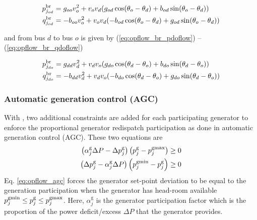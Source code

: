 \begin{align}
p^\mathrm{br}_{j_{od}} &= g_{oo}{v^2_o} + v_ov_d(g_{od}\cos(\theta_o - \theta_d) + b_{od}\sin(\theta_o - \theta_d)) \label{eq:opflow_br_podflow}\\
q^\mathrm{br}_{j_{od}} &= -b_{oo}{v^2_o} + v_ov_d(-b_{od}\cos(\theta_o - \theta_d) + g_{od}\sin(\theta_o - \theta_d)) \label{eq:opflow_br_qodflow}
\end{align}

\noindent
and from bus $d$ to bus $o$ is given by (\ref{eq:opflow_br_pdoflow}) -- (\ref{eq:opflow_br_qdoflow})

\begin{align}
p^\mathrm{br}_{j_{do}} &= g_{dd}{v^2_d} + v_dv_o(g_{do}\cos(\theta_d - \theta_o) + b_{do}\sin(\theta_d - \theta_o))  \label{eq:opflow_br_pdoflow} \\
q^\mathrm{br}_{j_{do}} &= -b_{dd}{v^2_d} + v_dv_o(-b_{do}\cos(\theta_d - \theta_o) + g_{do}\sin(\theta_d - \theta_o)) \label{eq:opflow_br_qdoflow}
\end{align}

\subsubsection{Automatic generation control (AGC)}
With \option{\opflowuseagc}, two additional constraints are added for each participating generator to enforce the proportional generator redispatch participation as done in automatic generation control (AGC). These two equations are 
\begin{equation}
\begin{aligned}
  \left(\alpha^{\text{g}}_j\Delta{P} - \Delta{p}^\mathrm{g}_j\right)\left(p^\mathrm{g}_j - p^\mathrm{gmax}_j\right) \ge 0 \\
  \left(\Delta{p}^\mathrm{g}_j - \alpha^{\text{g}}_j\Delta{P}\right)\left(p^\mathrm{gmin}_j - p^\mathrm{g}_j\right) \ge 0
\end{aligned}
\label{eq:opflow_agc}
\end{equation}
Eq. \ref{eq:opflow_agc} forces the generator set-point deviation to be equal to the generation participation when the generator has head-room available $p^\mathrm{gmin}_j \le p^\mathrm{g}_j \le p^\mathrm{gmax}_j$. Here, $\alpha^{\text{g}}_j$ is the generator participation factor which is the proportion of the power deficit/excess $\Delta{P}$ that the generator provides.

